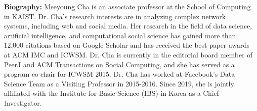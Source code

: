{\bfseries Biography:} Meeyoung Cha is an associate professor at the School of Computing in KAIST. Dr. Cha’s research interests are in analyzing complex network systems, including web and social media. Her research in the field of data science, artificial intelligence, and computational social science has gained more than 12,000 citations based on Google Scholar and has received the best paper awards at ACM IMC and ICWSM. Dr. Cha is currently in the editorial board member of PeerJ and ACM Transactions on Social Computing, and she has served as a program co-chair for ICWSM 2015. Dr. Cha has worked at Facebook’s Data Science Team as a Visiting Professor in 2015-2016. Since 2019, she is jointly affiliated with the Institute for Basic Science (IBS) in Korea as a Chief Investigator.
\newpage
